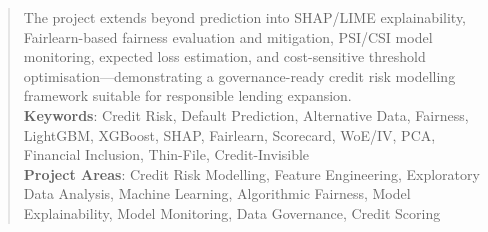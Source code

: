 \begin{abstract}
The project extends beyond prediction into SHAP/LIME explainability, Fairlearn-based fairness evaluation and mitigation, PSI/CSI model monitoring, expected loss estimation, and cost-sensitive threshold optimisation---demonstrating a governance-ready credit risk modelling framework suitable for responsible lending expansion.
\\
\textbf{Keywords}{: Credit Risk, Default Prediction, Alternative Data, Fairness, LightGBM, XGBoost, SHAP, Fairlearn, Scorecard, WoE/IV, PCA, Financial Inclusion, Thin-File, Credit-Invisible}\\
\textbf{Project Areas}{: Credit Risk Modelling, Feature Engineering, Exploratory Data Analysis, Machine Learning, Algorithmic Fairness, Model Explainability, Model Monitoring, Data Governance, Credit Scoring}

\end{abstract}
